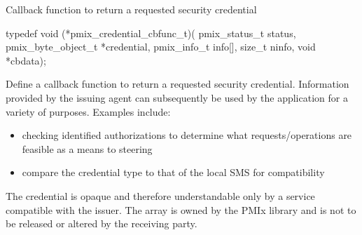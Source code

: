\summary

Callback function to return a requested security credential

\format

\cspecificstart
\begin{codepar}
typedef void (*pmix_credential_cbfunc_t)(
                    pmix_status_t status,
                    pmix_byte_object_t *credential,
                    pmix_info_t info[], size_t ninfo,
                    void *cbdata);
\end{codepar}
\cspecificend

\begin{arglist}
\end{arglist}

\descr

Define a callback function to return a requested security credential. Information provided by the issuing agent can subsequently be used
by the application for a variety of purposes. Examples include:

\begin{itemize}
    \item checking identified authorizations to determine what requests/operations are feasible as a means to steering 
    \item compare the credential type to that of the local SMS for compatibility
\end{itemize}

\adviceuserstart
The credential is opaque and therefore understandable only by a service compatible with the issuer. The  array is owned by the \ac{PMIx} library and is not to be released or altered by the receiving party.
\adviceuserend


\subsection{}

